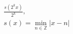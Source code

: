 \documentclass[preview]{standalone}
\begin{document}
\begin{align*}
\frac{s(2^k x)}{2^k}, \\ s(x) = \min_{n \in \mathbb{Z}} |x - n|
\end{align*}
\end{document}
